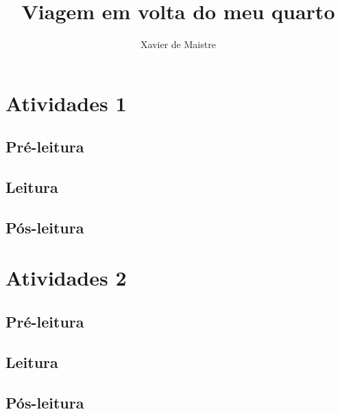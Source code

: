 \documentclass{article}
\begin{document}
\newcommand{\AutorLivro}{Xavier de Maistre}
\newcommand{\TituloLivro}{Viagem em volta do meu quarto}
\newcommand{\Tema}{Ficção, mistério e fantasia}
\newcommand{\Genero}{Romance}
\newcommand{\issnppub}{---}
\newcommand{\issnepub}{---}
\newcommand{\colaborador}{\textbf{Fulano de Tal} é uma pessoa incrível e vai fazer um bom serviço.}


\title{\TituloLivro}
\author{\AutorLivro}
\def\authornotes{\colaborador}

\date{}
\maketitle
\tableofcontents




\section{Atividades 1}


\subsection{Pré-leitura}
\subsection{Leitura}
\subsection{Pós-leitura}



\section{Atividades 2}

\subsection{Pré-leitura}
\subsection{Leitura}
\subsection{Pós-leitura}

\lipsum
\end{document}
